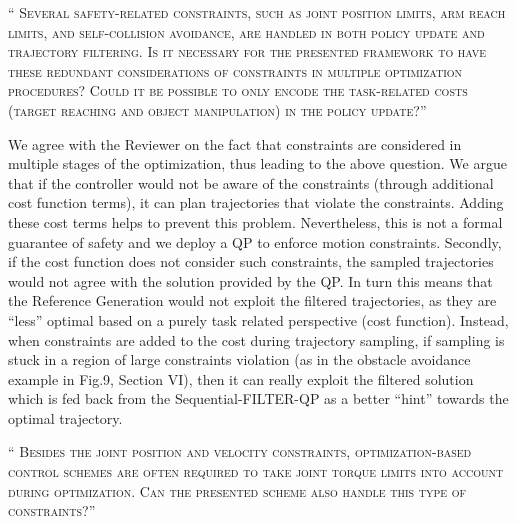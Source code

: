 \documentclass[10pt]{article}
\newcommand{\referee}[1]{\;
  \begin{minipage}[t]{.95\textwidth}
    ``{\small\color{red} \textsc{#1}}''
  \end{minipage}\medskip
  }
\begin{document}
\begin{enumerate}[label={[R3:\,\arabic{enumi}]}]
\item\label{reply:R3:9} 
\referee{Several safety-related constraints, such as joint position limits, arm reach limits, and self-collision avoidance, are handled in both policy update and trajectory filtering. Is it necessary for the presented framework to have these redundant considerations of constraints in multiple optimization procedures? Could it be possible to only encode the task-related costs (target reaching and object manipulation) in the policy update?}

We agree with the Reviewer on the fact that constraints are considered in multiple stages of the optimization, thus leading to the above question. We argue that if the controller would not be aware of the constraints (through additional cost function terms), it can plan trajectories that violate the constraints. Adding these cost terms helps to prevent this problem. Nevertheless, this is not a formal guarantee of safety and we deploy a QP to enforce motion constraints. Secondly, if the cost function does not consider such constraints, the sampled trajectories would not agree with the solution provided by the QP. In turn this means that the Reference Generation would not exploit the filtered trajectories, as they are “less” optimal based on a purely task related perspective (cost function). Instead, when constraints are added to the cost during trajectory sampling, if sampling is stuck in a region of large constraints violation (as in the obstacle avoidance example in Fig.9, Section VI), then it can really exploit the filtered solution which is fed back from the Sequential-FILTER-QP as a better “hint” towards the optimal trajectory.

\item\label{reply:R3:10} 
\referee{Besides the joint position and velocity constraints, optimization-based control schemes are often required to take joint torque limits into account during optimization. Can the presented scheme also handle this type of constraints?}


\end{enumerate}
\end{document}
